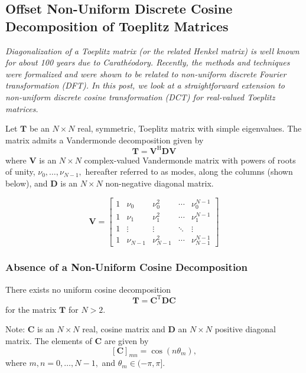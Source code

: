 \subsection{Offset Non-Uniform Discrete Cosine Decomposition of Toeplitz Matrices}

\emph{Diagonalization of a Toeplitz matrix (or the related Henkel matrix) is well known for about 100 years due to Carathéodory. Recently, the methods and techniques were formalized and were shown to be related to non-uniform discrete Fourier transformation (DFT). In this post, we look at a straightforward extension to non-uniform discrete cosine transformation (DCT) for real-valued Toeplitz matrices.}

Let $\boldsymbol{T}$ be an $N\times N$ real, symmetric, Toeplitz matrix with simple eigenvalues. The matrix admits a Vandermonde decomposition \cite{Boley1997, Backstrom2013} given by \[\boldsymbol{T} = \boldsymbol{V}^\text{H} \boldsymbol{D} \boldsymbol{V}\] where $\boldsymbol{V}$ is an $N\times N$ complex-valued Vandermonde matrix with powers of roots of unity, $\nu_0, \dots, \nu_{N-1},$ hereafter referred to as modes, along the columns (shown below), and $\boldsymbol{D}$ is an $N\times N$ non-negative diagonal matrix.

\[
\boldsymbol{V} = \begin{bmatrix} 1 & \nu_0 & \nu_0^2 & \cdots & \nu_0^{N-1} \\
	1 & \nu_1 & \nu_1^2 & \cdots & \nu_1^{N-1} \\
	1 & \vdots &  \vdots & \ddots & \vdots \\
	1 & \nu_{N-1} & \nu_{N-1}^2 & \cdots & \nu_{N-1}^{N-1}
\end{bmatrix}
\]

\subsubsection{Absence of a Non-Uniform Cosine Decomposition}

\begin{theorem}
There exists no uniform cosine decomposition \[\boldsymbol{T} = \boldsymbol{C}^\text{T} \boldsymbol{D} \boldsymbol{C}\] for the matrix $\boldsymbol{T}$ for $N > 2.$
\end{theorem}

Note: $\boldsymbol{C}$ is an $N\times N$ real, cosine matrix and $\boldsymbol{D}$ an $N\times N$ positive diagonal matrix. The elements of $\boldsymbol{C}$ are given by  \[ [\boldsymbol{C}]_{mn} = \cos(n \theta_m), \]
where $m, n = 0,\dots, N - 1,$ and $\theta_m \in (-\pi,\pi].$

